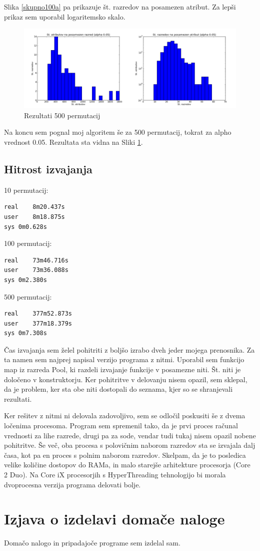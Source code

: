 \documentclass[a4paper,11pt]{article}
\begin{document}
Slika \ref{skupno100a} pa prikazuje št. razredov na posamezen atribut. Za lepši prikaz sem uporabil logaritemsko skalo.

\begin{figure}[H]
\begin{center}
\includegraphics[scale=0.2]{skupno500.png}
\caption{Rezultati 500 permutacij}
\label{skupno500}
\end{center}
\end{figure}

Na koncu sem pognal moj algoritem še za 500 permutacij, tokrat za alpho vrednost 0.05. Rezultata sta vidna na Sliki \ref{skupno500}.


\subsection{Hitrost izvajanja}
10 permutacij:
\begin{verbatim}
real	8m20.437s
user	8m18.875s
sys	0m0.628s
\end{verbatim}
100 permutacij:
\begin{verbatim}
real	73m46.716s
user	73m36.088s
sys	0m2.380s

\end{verbatim}
500 permutacij:
\begin{verbatim}
real	377m52.873s
user	377m18.379s
sys	0m7.308s
\end{verbatim}

Čas izvajanja sem želel pohitriti z boljšo izrabo dveh jeder mojega prenosnika. Za ta namen sem najprej napisal verzijo programa z nitmi. Uporabil sem funkcijo map iz razreda Pool, ki razdeli izvajanje funkcije v posamezne niti. Št. niti je določeno v konstruktorju. Ker pohitritve v delovanju nisem opazil, sem sklepal, da je problem, ker sta obe niti dostopali do seznama, kjer so se shranjevali rezultati.

Ker rešitev z nitmi ni delovala zadovoljivo, sem se odločil poskusiti še z dvema ločenima procesoma. Program sem spremenil tako, da je prvi proces računal vrednosti za lihe razrede, drugi pa za sode, vendar tudi tukaj nisem opazil nobene pohitritve. Še več, oba procesa s polovičnim naborom razredov sta se izvajala dalj časa, kot pa en proces s polnim naborom razredov. Skelpam, da je to posledica velike količine dostopov do RAMa, in malo starejše arhitekture procesorja (Core 2 Duo). Na Core iX procesorjih s HyperThreading tehnologijo bi morala dvoprocesna verzija programa delovati bolje. 

\section{Izjava o izdelavi domače naloge}
Domačo nalogo in pripadajoče programe sem izdelal sam.
\end{document}
